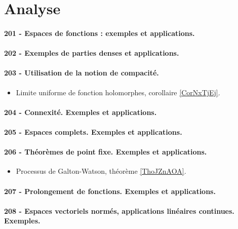 \section{Analyse}


\paragraph{201 - Espaces de fonctions : exemples et applications.}
\paragraph{202 - Exemples de parties denses et applications.}
\paragraph{203 - Utilisation de la notion de compacité.}
\begin{itemize}
    \item Limite uniforme de fonction holomorphes, corollaire \ref{CorNxTjEj}.
\end{itemize}
\paragraph{204 - Connexité. Exemples et applications.}
\paragraph{205 - Espaces complets. Exemples et applications.}
\paragraph{206 - Théorèmes de point fixe. Exemples et applications.}
\begin{itemize}
    \item Processus de Galton-Watson, théorème \ref{ThoJZnAOA}.
\end{itemize}
\paragraph{207 - Prolongement de fonctions. Exemples et applications.}
\paragraph{208 - Espaces vectoriels normés, applications linéaires continues. Exemples.}
